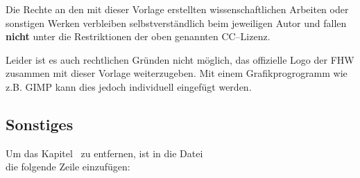 \documentclass[a4paper,12pt]{article}
\begin{document}
Die Rechte an den mit dieser Vorlage erstellten wissenschaftlichen Arbeiten oder sonstigen Werken verbleiben selbstverständlich beim jeweiligen Autor und fallen \textbf{nicht} unter die Restriktionen der oben genannten CC–Lizenz.

Leider ist es auch rechtlichen Gründen nicht möglich, das offizielle Logo der FHW zusammen mit dieser Vorlage weiterzugeben. Mit einem Grafikprogrogramm wie z.B. GIMP kann dies jedoch individuell eingefügt werden.

\subsection*{Sonstiges}

Um das Kapitel~ zu entfernen, ist in die Datei \\
 die folgende Zeile einzufügen:


\fi
\end{document}
